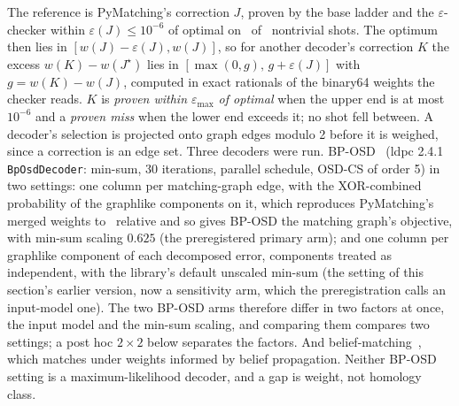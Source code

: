 \documentclass[aps,pra,twocolumn,superscriptaddress,nofootinbib,longbibliography,floatfix]{revtex4-2}
\newcommand{\eps}{\varepsilon}
\begin{document}
The reference is PyMatching's correction $J$, proven by the base ladder and the $\eps$-checker within $\eps(J)\le10^{-6}$ of optimal on \GapEpsRef\ of \GapNontrivial\ nontrivial shots. The optimum then lies in $[w(J)-\eps(J),w(J)]$, so for another decoder's correction $K$ the excess $w(K)-w(J^\star)$ lies in $[\max(0,g),\,g+\eps(J)]$ with $g=w(K)-w(J)$, computed in exact rationals of the binary64 weights the checker reads. $K$ is \emph{proven within $\eps_{\max}$ of optimal} when the upper end is at most $10^{-6}$ and a \emph{proven miss} when the lower end exceeds it; no shot fell between. A decoder's selection is projected onto graph edges modulo 2 before it is weighed, since a correction is an edge set. Three decoders were run. BP-OSD~\cite{panteleev2021degenerate,roffe2020decoding} (ldpc 2.4.1~\cite{roffe2022ldpc} \texttt{BpOsdDecoder}: min-sum, 30 iterations, parallel schedule, OSD-CS of order 5) in two settings: one column per matching-graph edge, with the XOR-combined probability of the graphlike components on it, which reproduces PyMatching's merged weights to \GapMergeRelDiff\ relative and so gives BP-OSD the matching graph's objective, with min-sum scaling $0.625$ (the preregistered primary arm); and one column per graphlike component of each decomposed error, components treated as independent, with the library's default unscaled min-sum (the setting of this section's earlier version, now a sensitivity arm, which the preregistration calls an input-model one). The two BP-OSD arms therefore differ in two factors at once, the input model and the min-sum scaling, and comparing them compares two settings; a post hoc $2\times2$ below separates the factors. And belief-matching~\cite{higgott2023improved}, which matches under weights informed by belief propagation. Neither BP-OSD setting is a maximum-likelihood decoder, and a gap is weight, not homology class.

\begin{table}[tbp]
\caption{Excess weight over the minimum on the preregistered shots, against PyMatching's correction proven within $\eps(J)\le10^{-6}$ of optimal ($N$ shots). ``Proven within'' counts corrections whose excess is proven at most $\eps_{\max}=10^{-6}$; a proven miss is proven to exceed it. The excess columns are the upper ends of the exact intervals $[\max(0,g),g+\eps(J)]$.}
\label{tab:gaps}
\small

\end{table}
\end{document}

